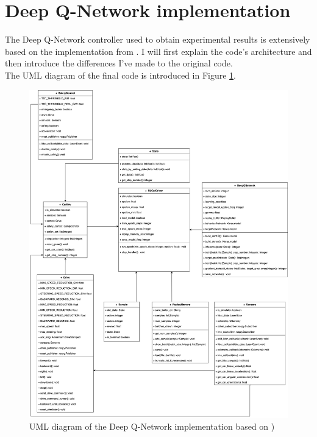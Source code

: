 \section{Deep Q-Network implementation}
The Deep Q-Network controller used to obtain experimental results is extensively based on the implementation from \cite{bosello}. I will first explain the code's architecture and then introduce the differences I've made to the original code. \\
The UML diagram of the final code is introduced in Figure \ref{uml}.
\begin{figure}
\centering
\includegraphics[scale=0.12]{Figures/UML_diagram.png}
\caption{UML diagram of the Deep Q-Network implementation based on \cite{bosello})}
\label{uml}
\end{figure}

